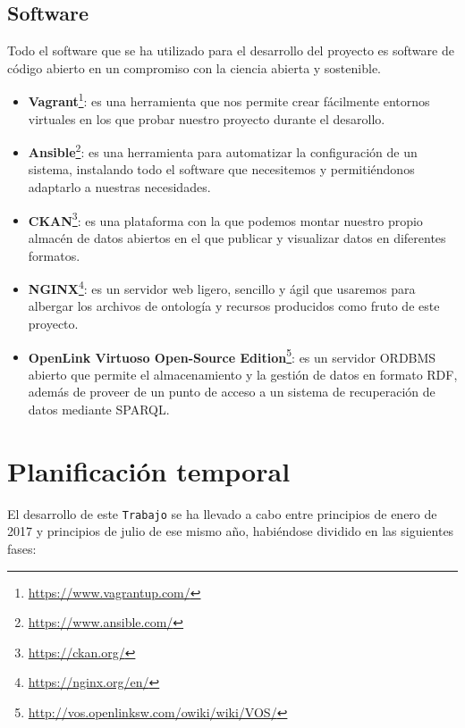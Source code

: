 \subsection{Software}

Todo el software que se ha utilizado para el desarrollo del proyecto es software de código abierto en un compromiso con la ciencia abierta y sostenible.

\begin{itemize}
	\item \textbf{Vagrant}\footnote{\url {https://www.vagrantup.com/}}: es una herramienta que nos permite crear fácilmente entornos virtuales en los que probar nuestro proyecto durante el desarollo. 
	\item \textbf{Ansible}\footnote{\url {https://www.ansible.com/}}: es una herramienta para automatizar la configuración de un sistema, instalando todo el software que necesitemos y permitiéndonos adaptarlo a nuestras necesidades. 
	\item \textbf{CKAN}\footnote{\url {https://ckan.org/}}: es una plataforma con la que podemos montar nuestro propio almacén de datos abiertos en el que publicar y visualizar datos en diferentes formatos.	
	\item \textbf{NGINX}\footnote{\url {https://nginx.org/en/}}: es un servidor web ligero, sencillo y ágil que usaremos para albergar los archivos de ontología y recursos producidos como fruto de este proyecto.
	\item \textbf{OpenLink Virtuoso Open-Source Edition}\footnote{\url {http://vos.openlinksw.com/owiki/wiki/VOS/}}: es un servidor ORDBMS abierto que permite el almacenamiento y la gestión de datos en formato RDF, además de proveer de un punto de acceso a un sistema de recuperación de datos mediante SPARQL.
\end{itemize}

\section{Planificación temporal}

El desarrollo de este {\tt Trabajo} se ha llevado a cabo entre principios de enero de 2017 y principios de julio de ese mismo año, habiéndose dividido en las siguientes fases:

